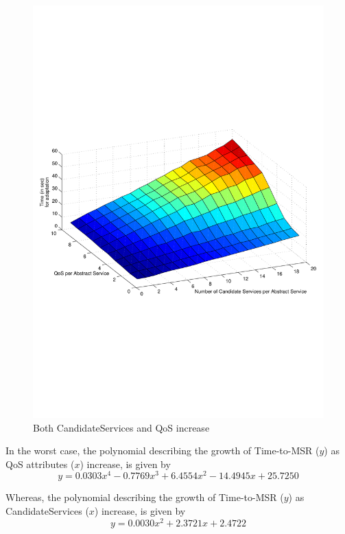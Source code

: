 \documentclass[10pt,journal,compsoc]{IEEEtran}
\begin{document}
\begin{figure}[htbp]
\centering
\includegraphics[clip, trim=0.5cm 8cm 1cm 9cm, scale=0.45]{graphs/scaling_time_svcs_qos.pdf}
\caption{Both CandidateServices and QoS increase \label{fig:svc_and_qos_scaling}}
\end{figure}

In the worst case, the polynomial describing the growth of Time-to-MSR ($y$) as QoS attributes ($x$) increase, is given by
\begin{equation}
    y =  0.0303x^{4}  - 0.7769x^{3} +   6.4554x^{2} - 14.4945x +  25.7250 \label{eq:qos_vs_cand}
\end{equation}

Whereas, the polynomial describing the growth of Time-to-MSR ($y$) as CandidateServices ($x$) increase, is given by
\begin{equation}
    y =  0.0030x^{2} +    2.3721x  +  2.4722 \label{eq:cand_vs_qos}
\end{equation}
\end{document}
